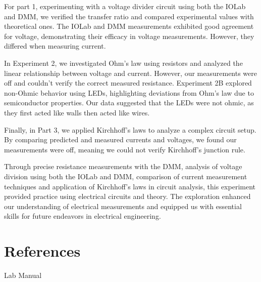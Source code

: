 \documentclass[11pt]{article}
\let\oldsection\section
\renewcommand\section{\clearpage\oldsection}
\begin{document}
    For part 1, experimenting with a voltage divider circuit using both the IOLab and DMM, we verified the transfer ratio and compared experimental values with theoretical ones. The IOLab and DMM measurements exhibited good agreement for voltage, demonstrating their efficacy in voltage measurements. However, they differed when measuring current.

    In Experiment 2, we investigated Ohm's law using resistors and analyzed the linear relationship between voltage and current. However, our measurements were off and couldn't verify the correct measured resistance. Experiment 2B explored non-Ohmic behavior using LEDs, highlighting deviations from Ohm's law due to semiconductor properties. Our data suggested that the LEDs were not ohmic, as they first acted like walls then acted like wires.

    Finally, in Part 3, we applied Kirchhoff's laws to analyze a complex circuit setup. By comparing predicted and measured currents and voltages, we found our measurements were off, meaning we could not verify Kirchhoff's junction rule.

    Through precise resistance measurements with the DMM, analysis of voltage division using both the IOLab and DMM, comparison of current measurement techniques and application of Kirchhoff's laws in circuit analysis, this experiment provided practice using electrical circuits and theory. The exploration enhanced our understanding of electrical measurements and equipped us with essential skills for future endeavors in electrical engineering.

    \section{References}\label{sec:references}

    Lab Manual
\end{document}

